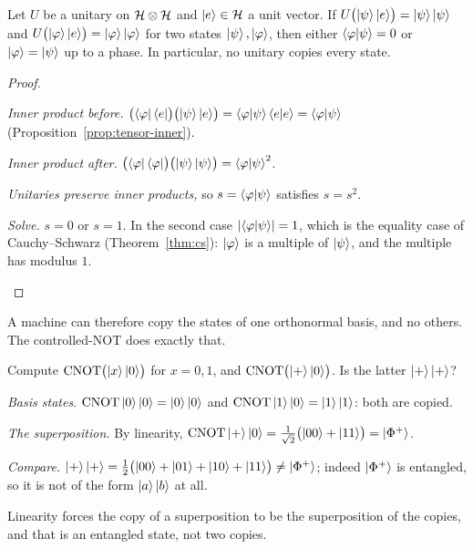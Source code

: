 \begin{theorem}\label{thm:no-cloning}
  Let $U$ be a unitary on $\mathcal{H}\otimes\mathcal{H}$ and $\left|e\right\rangle\in\mathcal{H}$ a unit vector. If $U\bigl(\left|\psi\right\rangle\left|e\right\rangle\bigr)=\left|\psi\right\rangle\left|\psi\right\rangle$ and $U\bigl(\left|\varphi\right\rangle\left|e\right\rangle\bigr)=\left|\varphi\right\rangle\left|\varphi\right\rangle$ for two states $\left|\psi\right\rangle,\left|\varphi\right\rangle$, then either $\left\langle\varphi\middle|\psi\right\rangle=0$ or $\left|\varphi\right\rangle=\left|\psi\right\rangle$ up to a phase. In particular, no unitary copies every state.
\end{theorem}
\begin{proof}
  \begin{steps}
    \item \emph{Inner product before.} $\bigl(\left\langle\varphi\right|\left\langle e\right|\bigr)\bigl(\left|\psi\right\rangle\left|e\right\rangle\bigr)=\left\langle\varphi\middle|\psi\right\rangle\left\langle e\middle|e\right\rangle=\left\langle\varphi\middle|\psi\right\rangle$ (Proposition~\ref{prop:tensor-inner}).
    \item \emph{Inner product after.} $\bigl(\left\langle\varphi\right|\left\langle\varphi\right|\bigr)\bigl(\left|\psi\right\rangle\left|\psi\right\rangle\bigr)=\left\langle\varphi\middle|\psi\right\rangle^2$.
    \item \emph{Unitaries preserve inner products,} so $s=\left\langle\varphi\middle|\psi\right\rangle$ satisfies $s=s^2$.
    \item \emph{Solve.} $s=0$ or $s=1$. In the second case $\left|\left\langle\varphi\middle|\psi\right\rangle\right|=1$, which is the equality case of Cauchy--Schwarz (Theorem~\ref{thm:cs}): $\left|\varphi\right\rangle$ is a multiple of $\left|\psi\right\rangle$, and the multiple has modulus $1$. \qedhere
  \end{steps}
\end{proof}

A machine can therefore copy the states of one orthonormal basis, and no others. The controlled-NOT does exactly that.

\begin{example}\label{ex:cnot-clone}
  Compute $\mathrm{CNOT}\bigl(\left|x\right\rangle\left|0\right\rangle\bigr)$ for $x=0,1$, and $\mathrm{CNOT}\bigl(\left|+\right\rangle\left|0\right\rangle\bigr)$. Is the latter $\left|+\right\rangle\left|+\right\rangle$?
\end{example}
\begin{solution}
  \begin{steps}
    \item \emph{Basis states.} $\mathrm{CNOT}\left|0\right\rangle\left|0\right\rangle=\left|0\right\rangle\left|0\right\rangle$ and $\mathrm{CNOT}\left|1\right\rangle\left|0\right\rangle=\left|1\right\rangle\left|1\right\rangle$: both are copied.
    \item \emph{The superposition.} By linearity, $\mathrm{CNOT}\left|+\right\rangle\left|0\right\rangle=\tfrac1{\sqrt2}\bigl(\left|00\right\rangle+\left|11\right\rangle\bigr)=\left|\Phi^+\right\rangle$.
    \item \emph{Compare.} $\left|+\right\rangle\left|+\right\rangle=\tfrac12\bigl(\left|00\right\rangle+\left|01\right\rangle+\left|10\right\rangle+\left|11\right\rangle\bigr)\neq\left|\Phi^+\right\rangle$; indeed $\left|\Phi^+\right\rangle$ is entangled, so it is not of the form $\left|a\right\rangle\left|b\right\rangle$ at all.
  \end{steps}
  Linearity forces the copy of a superposition to be the superposition of the copies, and that is an entangled state, not two copies.
\end{solution}

